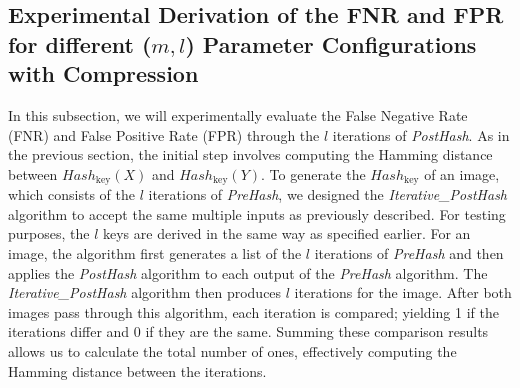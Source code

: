 \subsection{Experimental Derivation of the FNR and FPR for different (\(m, l\)) Parameter Configurations with Compression}
In this subsection, we will experimentally evaluate the False Negative Rate (FNR) and False Positive Rate (FPR) through the \(l\) iterations of \textit{PostHash}. As in the previous section, the initial step involves computing the Hamming distance between \(Hash_{\text{key}}(X)\) and \(Hash_{\text{key}}(Y)\). To generate the \(Hash_{\text{key}}\) of an image, which consists of the \(l\) iterations of \textit{PreHash}, we designed the \textit{Iterative\_PostHash} algorithm to accept the same multiple inputs as previously described. For testing purposes, the \(l\) keys are derived in the same way as specified earlier. For an image, the algorithm first generates a list of the \(l\) iterations of \textit{PreHash} and then applies the \textit{PostHash} algorithm to each output of the \textit{PreHash} algorithm. The \textit{Iterative\_PostHash} algorithm then produces \(l\) iterations for the image. After both images pass through this algorithm, each iteration is compared; yielding 1 if the iterations differ and 0 if they are the same. Summing these comparison results allows us to calculate the total number of ones, effectively computing the Hamming distance between the iterations.


